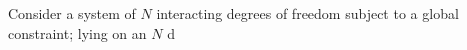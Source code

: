 Consider a system of $N$ interacting degrees of freedom subject to a global constraint; lying on an $N$ d